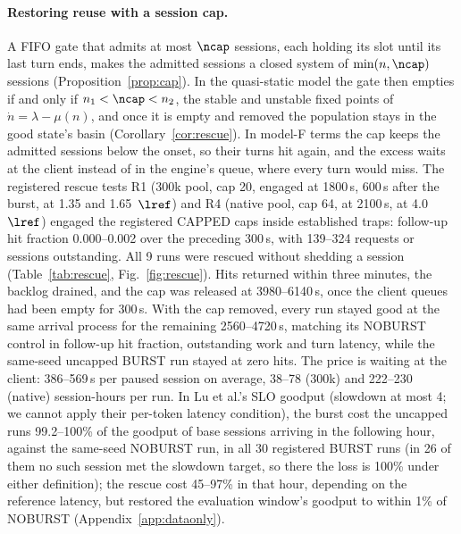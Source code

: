 \paragraph{Restoring reuse with a session cap.} A FIFO gate that admits at most $\ncap$ sessions, each holding its slot until its
last turn ends, makes the admitted sessions a closed system of $\min(n,\ncap)$ sessions (Proposition~\ref{prop:cap}). In the
quasi-static model the gate then empties if and only if $n_1<\ncap<n_2$, the stable and unstable fixed points of $\dot n=\lambda-\mu(n)$, and once it
is empty and removed the population stays in the good state's basin (Corollary~\ref{cor:rescue}). In model-F terms the cap keeps
the admitted sessions below the onset, so their turns hit again, and the excess waits at the client instead of in the engine's
queue, where every turn would miss. The registered rescue tests R1 (300k pool, cap 20, engaged at 1800\,s, 600\,s after the burst,
at 1.35 and 1.65~$\lref$) and R4 (native pool, cap 64, at 2100\,s, at 4.0~$\lref$) engaged the registered CAPPED caps inside
established traps: follow-up hit fraction 0.000--0.002 over the preceding 300\,s, with 139--324 requests or sessions outstanding.
All 9 runs were rescued without shedding a session (Table~\ref{tab:rescue}, Fig.~\ref{fig:rescue}). Hits returned within three
minutes, the backlog drained, and the cap was released at 3980--6140\,s, once the client queues had been empty for 300\,s. With
the cap removed, every run stayed good at the same arrival process for the remaining 2560--4720\,s, matching its NOBURST control in
follow-up hit fraction, outstanding work and turn latency, while the same-seed uncapped BURST run stayed at zero hits. The price is
waiting at the client: 386--569\,s per paused session on average, 38--78 (300k) and 222--230 (native) session-hours per run. In Lu
et al.'s SLO goodput (slowdown at most 4; we cannot apply their per-token latency condition), the burst cost the uncapped runs
99.2--100\% of the goodput of base sessions arriving in the following hour, against the same-seed NOBURST run, in all 30 registered
BURST runs (in 26 of them no such session met the slowdown target, so there the loss is 100\% under either definition); the rescue
cost 45--97\% in that hour, depending on the reference latency, but restored the evaluation window's goodput to within 1\% of
NOBURST (Appendix~\ref{app:dataonly}).


